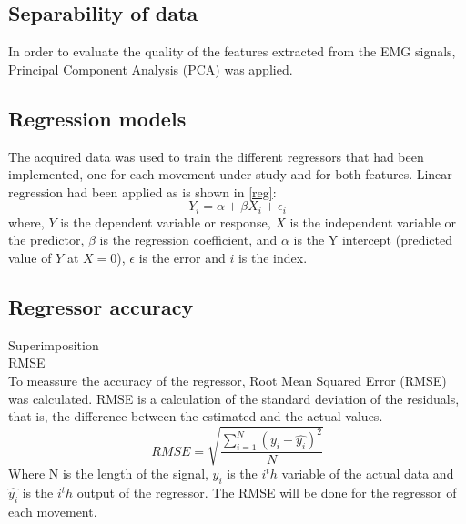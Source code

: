 \documentclass[a4paper, 10pt, conference]{ieeeconf}      %
\begin{document}
	\subsection{Separability of data}
	In order to evaluate the quality of the features extracted from the EMG signals, Principal Component Analysis (PCA) was applied. 
	\subsection{Regression models}
	The acquired data was used to train the different regressors that had been implemented, one for each movement under study and for both features. Linear regression had been applied as is shown in \ref{reg}:
	\begin{equation} \label{eq:simpleLinearRegression}
	Y_i = \alpha + \beta X_i + \epsilon_i
	\label{reg}
	\end{equation}
	where, $Y$ is the dependent variable or response, $X$ is the independent variable or the predictor, $\beta$ is the regression coefficient, and $\alpha$ is the Y intercept (predicted value of $Y$ at $X = 0$),  $\epsilon$ is the error and $i$ is the index.
	
	
	\subsection{Regressor accuracy}
	Superimposition\\
	RMSE\\
	To meassure the accuracy of the regressor, Root Mean Squared Error (RMSE) was calculated. RMSE is a calculation of the standard deviation of the residuals, that is, the difference between the estimated and the actual values.
	\begin{equation}
	RMSE = \sqrt{\frac{\sum\limits_{i=1}^N(y_i - \hat{y_i})^2}{N}}
	\end{equation}
	Where N is the length of the signal, $y_i$ is the $i^th$ variable of the actual data and $\hat{y_i}$ is the $i^th$ output of the regressor. The RMSE will be done for the regressor of each movement.\\
	
\end{document}
